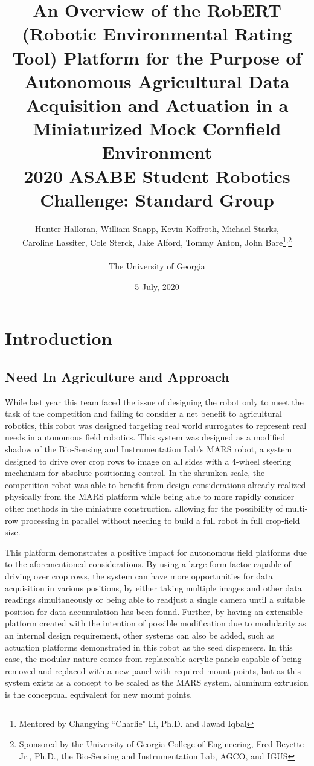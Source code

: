 \documentclass[11pt, hidelinks]{report}
\title{An Overview of the RobERT (Robotic Environmental Rating Tool) Platform for the Purpose of Autonomous Agricultural Data Acquisition and Actuation in a Miniaturized Mock Cornfield Environment \\ \bigskip \bigskip
\Large 2020 ASABE Student Robotics Challenge: Standard Group}
\author{Hunter Halloran, William Snapp, Kevin Koffroth, Michael Starks, \\Caroline Lassiter, Cole Sterck, Jake Alford, Tommy Anton, John Bare\thanks {Mentored by Changying ``Charlie" Li, Ph.D. and Jawad Iqbal}\textsuperscript{,}\thanks{Sponsored by the University of Georgia College of Engineering, Fred Beyette Jr., Ph.D., the Bio-Sensing and Instrumentation Lab, AGCO, and IGUS} \\ \\ The University of Georgia}
\date{5 July, 2020}
\begin{document}
\begin{titlepage}
\maketitle
\end{titlepage}

\newpage
\setcounter{tocdepth}{3}
\raggedbottom
\tableofcontents
\newpage

\section{Introduction}
\subsection{Need In Agriculture and Approach}
While last year this team faced the issue of designing the robot only to meet the task of the competition and failing to consider a net benefit to agricultural robotics, this robot was designed targeting real world surrogates to represent real needs in autonomous field robotics. This system was designed as a modified shadow of the Bio-Sensing and Instrumentation Lab’s MARS robot, a system designed to drive over crop rows to image on all sides with a 4-wheel steering mechanism for absolute positioning control. In the shrunken scale, the competition robot was able to benefit from design considerations already realized physically from the MARS platform while being able to more rapidly consider other methods in the miniature construction, allowing for the possibility of multi-row processing in parallel without needing to build a full robot in full crop-field size. 

This platform demonstrates a positive impact for autonomous field platforms due to the aforementioned considerations. By using a large form factor capable of driving over crop rows, the system can have more opportunities for data acquisition in various positions, by either taking multiple images and other data readings simultaneously or being able to readjust a single camera until a suitable position for data accumulation has been found. Further, by having an extensible platform created with the intention of possible modification due to modularity as an internal design requirement, other systems can also be added, such as actuation platforms demonstrated in this robot as the seed dispensers. In this case, the modular nature comes from replaceable acrylic panels capable of being removed and replaced with a new panel with required mount points, but as this system exists as a concept to be scaled as the MARS system, aluminum extrusion is the conceptual equivalent for new mount points.
\end{document}
